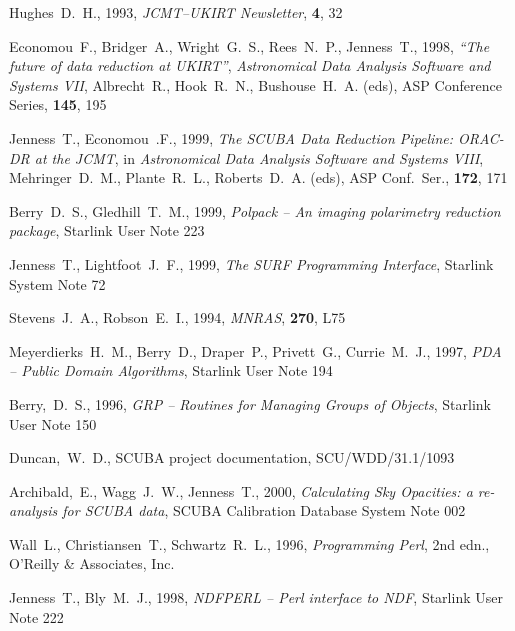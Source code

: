 \documentclass[twoside,11pt]{article}
\newcommand{\htmladdnormallink}[2]{#1}
\newcommand{\xref}[3]{#1}
\renewcommand{\_}{\texttt{\symbol{95}}}
\begin{document}
\begin{thebibliography}{}
Hughes~D.~H., 1993, {\it JCMT--UKIRT Newsletter}, {\bf 4}, 32

Economou~F., Bridger~A., Wright~G.~S., Rees~N.~P., Jenness~T., 1998, 
\htmladdnormallink{\textit{``The future of data reduction at UKIRT''}}{http://www.stsci.edu/stsci/meetings/adassVII/economouf.html},
\emph{Astronomical Data Analysis Software and Systems VII}, Albrecht~R.,
Hook~R.~N., Bushouse~H.~A. (eds), ASP Conference Series, \textbf{145}, 195

Jenness~T., Economou~.F., 1999, \textit{The SCUBA Data Reduction Pipeline:
ORAC-DR at the JCMT}, in \textit{Astronomical Data Analysis Software and
Systems VIII}, Mehringer~D.~M., Plante~R.~L., Roberts~D.~A. (eds),
ASP Conf.\ Ser., \textbf{172}, 171


Berry~D.~S., Gledhill~T.~M., 1999, 
\textit{Polpack -- An imaging polarimetry reduction package},
\xref{Starlink User Note 223}{sun223}{}

Jenness~T., Lightfoot~J.~F., 1999, {\it The SURF Programming Interface},
\xref{Starlink System Note 72}{ssn72}{}

Stevens~J.~A.,  Robson~E.~I.,  1994, {\it  MNRAS}, {\bf 270}, L75


Meyerdierks~H.~M., Berry~D., Draper~P., Privett~G., Currie~M.~J., 1997,
\textit{PDA -- Public Domain Algorithms}, 
\xref{Starlink User Note 194}{sun194}{}

Berry,~D.~S., 1996, 
\textit{GRP -- Routines for Managing Groups of Objects},
\xref{Starlink User Note 150}{sun150}{}

Duncan,~W.~D., SCUBA project documentation, SCU/WDD/31.1/1093

Archibald,~E., Wagg~J.~W., Jenness~T., 2000, 
\textit{Calculating Sky Opacities: a re-analysis for SCUBA data},
SCUBA Calibration Database System Note 002

Wall~L., Christiansen~T., Schwartz~R.~L., 1996, 
\htmladdnormallink{\textit{Programming Perl}}{http://www.perl.org/}, 2nd
edn., \htmladdnormallink{O'Reilly \& Associates, Inc.}{http://www.ora.com/}

Jenness~T., Bly~M.~J., 1998,
\textit{NDFPERL -- Perl interface to NDF},
\xref{Starlink User Note 222}{sun222}{}

\end{thebibliography}


\appendix
\end{document}

